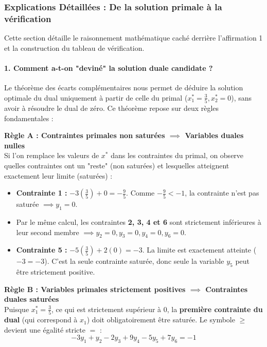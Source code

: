 \documentclass[12pt,a4paper]{article}
\begin{document}
\subsubsection*{Explications Détaillées : De la solution primale à la vérification}

Cette section détaille le raisonnement mathématique caché derrière l'affirmation 1 et la construction du tableau de vérification.

\paragraph{1. Comment a-t-on "deviné" la solution duale candidate ?}
Le théorème des écarts complémentaires nous permet de déduire la solution optimale du dual uniquement à partir de celle du primal ($x_1^* = \frac{3}{5}, x_2^* = 0$), sans avoir à résoudre le dual de zéro. Ce théorème repose sur deux règles fondamentales :

\vspace{0.3cm}
\noindent\textbf{Règle A : Contraintes primales non saturées $\implies$ Variables duales nulles} \\
Si l'on remplace les valeurs de $x^*$ dans les contraintes du primal, on observe quelles contraintes ont un "reste" (non saturées) et lesquelles atteignent exactement leur limite (saturées) :
\begin{itemize}
    \item \textbf{Contrainte 1 :} $-3(\frac{3}{5}) + 0 = -\frac{9}{5}$. Comme $-\frac{9}{5} < -1$, la contrainte n'est pas saturée $\implies y_1 = 0$.
    \item Par le même calcul, les contraintes \textbf{2, 3, 4 et 6} sont strictement inférieures à leur second membre $\implies y_2 = 0, y_3 = 0, y_4 = 0, y_6 = 0$.
    \item \textbf{Contrainte 5 :} $-5(\frac{3}{5}) + 2(0) = -3$. La limite est exactement atteinte ($-3 = -3$). C'est la seule contrainte saturée, donc seule la variable $y_5$ peut être strictement positive.
\end{itemize}

\vspace{0.3cm}
\noindent\textbf{Règle B : Variables primales strictement positives $\implies$ Contraintes duales saturées} \\
Puisque $x_1^* = \frac{3}{5}$, ce qui est strictement supérieur à $0$, la \textbf{première contrainte du dual} (qui correspond à $x_1$) doit obligatoirement être saturée. Le symbole $\geq$ devient une égalité stricte $=$ :
$$ -3y_1 + y_2 - 2y_3 + 9y_4 - 5y_5 + 7y_6 = -1 $$
\end{document}

